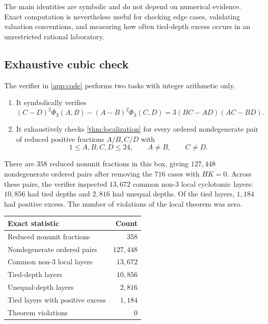 \documentclass[11pt]{article}
\theoremstyle{definition}
\theoremstyle{remark}
\begin{document}
The main identities are symbolic and do not depend on numerical evidence.  Exact computation is nevertheless useful for checking edge cases, validating valuation conventions, and measuring how often tied-depth excess occurs in an unrestricted rational laboratory.

\subsection{Exhaustive cubic check}

The verifier in \cref{app:code} performs two tasks with integer arithmetic only.

\begin{enumerate}
\item It symbolically verifies
\begin{equation}\label{eq:symbolic-verify}
 (C-D)^2\Phi_3(A,B)-(A-B)^2\Phi_3(C,D)
 =3(BC-AD)(AC-BD).
\end{equation}
\item It exhaustively checks \cref{thm:localization} for every ordered nondegenerate pair of reduced positive fractions $A/B,C/D$ with
\[
 1\le A,B,C,D\le24,
 \qquad A\ne B,
 \qquad C\ne D.
\]
\end{enumerate}

There are $358$ reduced nonunit fractions in this box, giving $127{,}448$ nondegenerate ordered pairs after removing the $716$ cases with $H K=0$.  Across these pairs, the verifier inspected $13{,}672$ common non-$3$ local cyclotomic layers: $10{,}856$ had tied depths and $2{,}816$ had unequal depths.  Of the tied layers, $1{,}184$ had positive excess.  The number of violations of the local theorem was zero.

\begin{center}
\begin{tabular}{@{}lr@{}}
\toprule
Exact statistic & Count\\
\midrule
Reduced nonunit fractions & $358$\\
Nondegenerate ordered pairs & $127{,}448$\\
Common non-$3$ local layers & $13{,}672$\\
Tied-depth layers & $10{,}856$\\
Unequal-depth layers & $2{,}816$\\
Tied layers with positive excess & $1{,}184$\\
Theorem violations & $0$\\
\bottomrule
\end{tabular}
\end{center}
\end{document}
